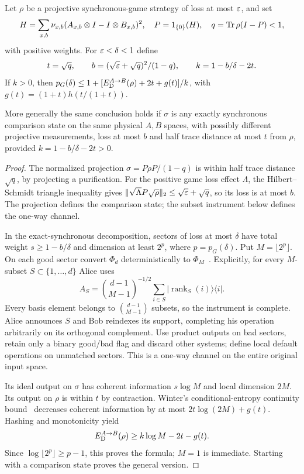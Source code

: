 \begin{proposition}\label{prop:physical-leakage}
Let $\rho$ be a projective synchronous-game strategy of loss at most $\varepsilon$, and set
\[
 H=\sum_{x,b}\nu_{x,b}(A_{x,b}\otimes I-I\otimes B_{x,b})^2,\quad
 P=1_{\{0\}}(H),\quad q=\operatorname{Tr}\rho(I-P)<1,
\]
with positive weights. For $\varepsilon<\delta<1$ define
\[
 t=\sqrt q,\qquad b=(\sqrt{\varepsilon}+\sqrt q)^2/(1-q),\qquad k=1-b/\delta-2t.
\]
If $k>0$, then $p_G(\delta)\le1+[E_{\mathrm D}^{A\to B}(\rho)+2t+g(t)]/k$, with $g(t)=(1+t)h(t/(1+t))$.

More generally the same conclusion holds if $\sigma$ is any exactly synchronous comparison state on the same physical $A,B$ spaces, with possibly different projective measurements, loss at most $b$ and half trace distance at most $t$ from $\rho$, provided $k=1-b/\delta-2t>0$.
\end{proposition}
\begin{proof}
The normalized projection $\sigma=P\rho P/(1-q)$ is within half trace distance $\sqrt q$, by projecting a purification. For the positive game loss effect $\Lambda$, the Hilbert--Schmidt triangle inequality gives $\|\sqrt\Lambda P\sqrt\rho\|_2\le\sqrt{\varepsilon}+\sqrt q$, so its loss is at most $b$. The projection defines the comparison state; the subset instrument below defines the one-way channel.

In the exact-synchronous decomposition, sectors of loss at most $\delta$ have total weight $s\ge1-b/\delta$ and dimension at least $2^p$, where $p=p_G(\delta)$. Put $M=\lfloor2^p\rfloor$. On each good sector convert $\Phi_d$ deterministically to $\Phi_M$~\cite{Nie99}. Explicitly, for every $M$-subset $S\subset\{1,\ldots,d\}$ Alice uses
\[
 A_S={\binom{d-1}{M-1}}^{-1/2}\sum_{i\in S}|\operatorname{rank}_S(i)\rangle\langle i|.
\]
Every basis element belongs to $\binom{d-1}{M-1}$ subsets, so the instrument is complete. Alice announces $S$ and Bob reindexes its support, completing his operation arbitrarily on its orthogonal complement. Use product outputs on bad sectors, retain only a binary good/bad flag and discard other systems; define local default operations on unmatched sectors. This is a one-way channel on the entire original input space.

Its ideal output on $\sigma$ has coherent information $s\log M$ and local dimension $2M$. Its output on $\rho$ is within $t$ by contraction. Winter's conditional-entropy continuity bound~\cite[Lemma~2]{Winter16} decreases coherent information by at most $2t\log(2M)+g(t)$. Hashing and monotonicity yield
\[
 E_{\mathrm D}^{A\to B}(\rho)\ge k\log M-2t-g(t).
\]
Since $\log\lfloor2^p\rfloor\ge p-1$, this proves the formula; $M=1$ is immediate. Starting with a comparison state proves the general version.
\end{proof}

